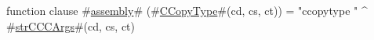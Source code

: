 function clause #\hyperref[sailMIPSzassembly]{assembly}# (#\hyperref[sailMIPSzCCopyType]{CCopyType}#(cd, cs, ct)) = "ccopytype " ^ #\hyperref[sailMIPSzstrCCCArgs]{strCCCArgs}#(cd, cs, ct)
